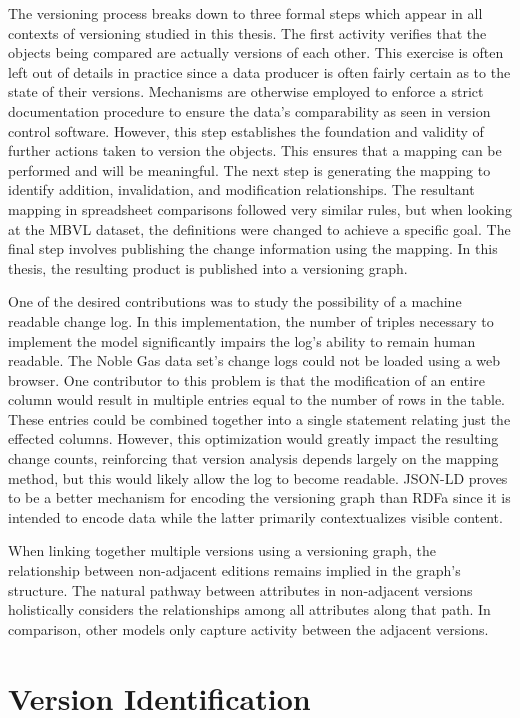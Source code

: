 The versioning process breaks down to three formal steps which appear in all contexts of versioning studied in this thesis.
The first activity verifies that the objects being compared are actually versions of each other.
This exercise is often left out of details in practice since a data producer is often fairly certain as to the state of their versions.
Mechanisms are otherwise employed to enforce a strict documentation procedure to ensure the data's comparability as seen in version control software.
However, this step establishes the foundation and validity of further actions taken to version the objects.
This ensures that a mapping can be performed and will be meaningful.
The next step is generating the mapping to identify addition, invalidation, and modification relationships.
The resultant mapping in spreadsheet comparisons followed very similar rules, but when looking at the MBVL dataset, the definitions were changed to achieve a specific goal.
The final step involves publishing the change information using the mapping.
In this thesis, the resulting product is published into a versioning graph.

One of the desired contributions was to study the possibility of a machine readable change log.
In this implementation, the number of triples necessary to implement the model significantly impairs the log's ability to remain human readable.
The Noble Gas data set's change logs could not be loaded using a web browser.
One contributor to this problem is that the modification of an entire column would result in multiple entries equal to the number of rows in the table.
These entries could be combined together into a single statement relating just the effected columns.
However, this optimization would greatly impact the resulting change counts, reinforcing that version analysis depends largely on the mapping method, but this would likely allow the log to become readable.
JSON-LD proves to be a better mechanism for encoding the versioning graph than RDFa since it is intended to encode data while the latter primarily contextualizes visible content.

When linking together multiple versions using a versioning graph, the relationship between non-adjacent editions remains implied in the graph's structure.
The natural pathway between attributes in non-adjacent versions holistically considers the relationships among all attributes along that path.
In comparison, other models only capture activity between the adjacent versions.

\section{Version Identification}

